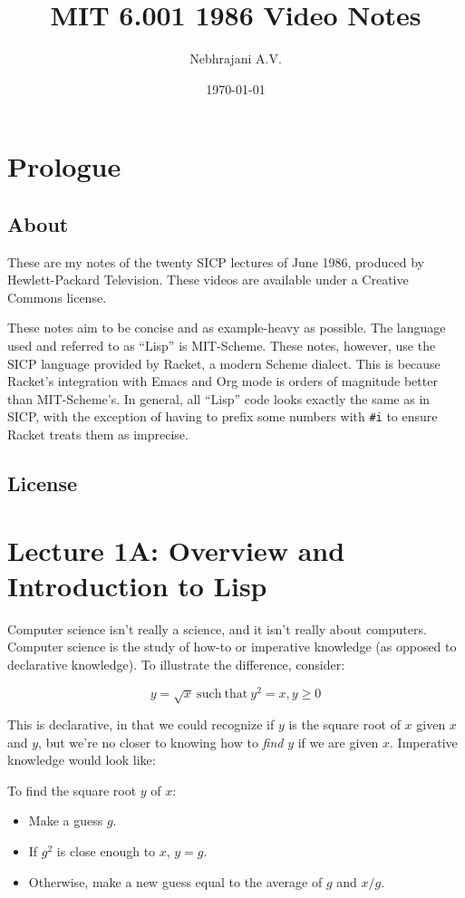 \documentclass[9pt]{report}
\author{Nebhrajani A.V.}
\date{\today}
\title{MIT 6.001 1986 Video Notes}
\begin{document}
\maketitle
\tableofcontents

\newpage

\chapter{Prologue}
\label{sec:org403dd19}
\section{About}
\label{sec:orgfac3505}
These are my notes of the twenty SICP lectures of June 1986,
produced by Hewlett-Packard Television. These videos are available
under a Creative Commons license.

These notes aim to be concise and as example-heavy as possible. The
language used and referred to as ``Lisp'' is MIT-Scheme. These notes,
however, use the SICP language provided by Racket, a modern Scheme
dialect. This is because Racket's integration with Emacs and
Org mode is orders of magnitude better than MIT-Scheme's. In
general, all ``Lisp'' code looks exactly the same as in SICP, with the
exception of having to prefix some numbers with \texttt{\#i} to ensure
Racket treats them as imprecise.

\section{License}
\label{sec:orgd356acf}
\doclicenseThis

\chapter{Lecture 1A: Overview and Introduction to Lisp}
\label{sec:org32a93e4}

Computer science isn't really a science, and it isn't really about
computers. Computer science is the study of how-to or imperative
knowledge (as opposed to declarative knowledge). To illustrate the
difference, consider:

$$y = \sqrt{x} \mathrm{~such~that~} y^2=x, y \geq 0$$

This is declarative, in that we could recognize if \(y\) is the square
root of \(x\) given \(x\) and \(y\), but we're no closer to knowing how to
\emph{find} \(y\) if we are given \(x\). Imperative knowledge would look
like:

To find the square root \(y\) of \(x\):
\begin{itemize}
\item Make a guess \(g\).
\item If \(g^2\) is close enough to \(x\), \(y=g\).
\item Otherwise, make a new guess equal to the average of \(g\) and \(x/g\).
\end{itemize}
\end{document}
